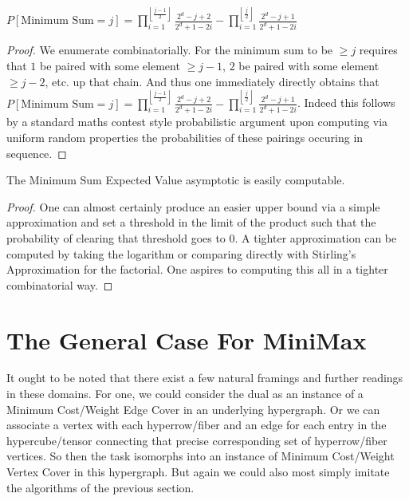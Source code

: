 \documentclass[12pt]{article}
\begin{document}
\begin{theorem}\label{Thm:$n = 2$ Minimum Sum Distribution}
	$P[\text{Minimum Sum} = j] = \prod_{i=1}^{\left \lfloor \frac{j-1}{2} \right \rfloor} \frac{2^d-j+2}{2^d+1-2i} - \prod_{i=1}^{\left \lfloor \frac{j}{2} \right \rfloor} \frac{2^d-j+1}{2^d+1-2i}$
\end{theorem}

\begin{proof}
	We enumerate combinatorially. For the minimum sum to be $\ge j$ requires that $1$ be paired with some element $\ge j-1$, $2$ be paired with some element $\ge j-2$, etc. up that chain. And thus one immediately directly obtains that $P[\text{Minimum Sum} = j] = \prod_{i=1}^{\left \lfloor \frac{j-1}{2} \right \rfloor} \frac{2^d-j+2}{2^d+1-2i} - \prod_{i=1}^{\left \lfloor \frac{j}{2} \right \rfloor} \frac{2^d-j+1}{2^d+1-2i}$. Indeed this follows by a standard maths contest style probabilistic argument upon computing via uniform random properties the probabilities of these pairings occuring in sequence.
\end{proof}

\begin{theorem}\label{Thm:$n = 2$ Minimum Sum Expected Value Asymptotic}
	The Minimum Sum Expected Value asymptotic is easily computable.
\end{theorem}

\begin{proof}
	One can almost certainly produce an easier upper bound via a simple approximation and set a threshold in the limit of the product such that the probability of clearing that threshold goes to $0$. A tighter approximation can be computed by taking the logarithm or comparing directly with Stirling's Approximation for the factorial. One aspires to computing this all in a tighter combinatorial way.
\end{proof}


\section{The General Case For MiniMax}

It ought to be noted that there exist a few natural framings and further readings in these domains. For one, we could consider the dual as an instance of a Minimum Cost/Weight Edge Cover in an underlying hypergraph. Or we can associate a vertex with each hyperrow/fiber and an edge for each entry in the hypercube/tensor connecting that precise corresponding set of hyperrow/fiber vertices. So then the task isomorphs into an instance of Minimum Cost/Weight Vertex Cover in this hypergraph. But again we could also most simply imitate the algorithms of the previous section.
\end{document}
